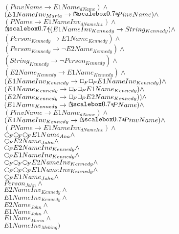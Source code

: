 \documentclass[a4paper,10pt]{article}
\begin{document}
 $ (PinvName \rightarrow E1Name_{dName}) \land $ \\ 
 $ (E1NameInv_{Maria} \rightarrow  \SVbox PinvName) \land $ \\ 
 $ (PName \rightarrow E1NameInv_{dNameInv}) \land $ \\ 
 $  \SVbox ((E1NameInv_{Kennedy} \rightarrow String_{Kennedy}) \land $ \\ 
 $ (Person_{Kennedy} \rightarrow E1Name_{Kennedy}) \land $ \\ 
 $ (Person_{Kennedy} \rightarrow  \lnot E2Name_{Kennedy}) \land $ \\ 
 $ (String_{Kennedy} \rightarrow  \lnot Person_{Kennedy}) \land $ \\ 
 $ (E2Name_{Kennedy} \rightarrow E1Name_{Kennedy}) \land $ \\ 
 $ (E1NameInv_{Kennedy} \rightarrow  \Box_{\!F}  \Box_{\!P} E1NameInv_{Kennedy}) \land $ \\ 
 $ (E1Name_{Kennedy} \rightarrow  \Box_{\!F}  \Box_{\!P} E1Name_{Kennedy}) \land $ \\ 
 $ (E2Name_{Kennedy} \rightarrow  \Box_{\!F}  \Box_{\!P} E2Name_{Kennedy})) \land $ \\ 
 $ (E1Name_{Kennedy} \rightarrow  \SVbox PName) \land $ \\ 
 $ (PinvName \rightarrow E1Name_{dName}) \land $ \\ 
 $ (E1NameInv_{Kennedy} \rightarrow  \SVbox PinvName) \land $ \\ 
 $ (PName \rightarrow E1NameInv_{dNameInv}) \land $ \\ 
 $  \Rnext  \Rnext  \Rnext E1Name_{Ana} \land $ \\ 
 $  \Rnext E2Name_{John} \land $ \\ 
 $  \Rnext E2NameInv_{Kennedy} \land $ \\ 
 $  \Rnext E1NameInv_{Kennedy} \land $ \\ 
 $  \Rnext  \Rnext  \Rnext E2NameInv_{Kennedy} \land $ \\ 
 $  \Rnext  \Rnext  \Rnext E1NameInv_{Kennedy} \land $ \\ 
 $  \Rnext E1Name_{John} \land $ \\ 
 $ Person_{John} \land $ \\ 
 $ E2NameInv_{Kennedy} \land $ \\ 
 $ E1NameInv_{Kennedy} \land $ \\ 
 $ E2Name_{John} \land $ \\ 
 $ E1Name_{John} \land $ \\ 
 $ E1Name_{Maria} \land $ \\ 
 $ E1NameInv_{Mcking})$ 
\end{document}
